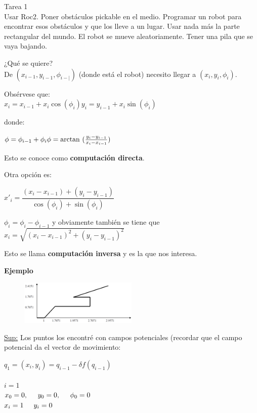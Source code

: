 \begin{scaja}
Tarea 1 \\
Usar Roc2. Poner obstáculos pickable en el medio. Programar un robot para encontrar esos obstáculos y que
los lleve a un lugar. Usar nada más la parte rectangular del mundo. El robot se mueve aleatoriamente. Tener
una pila que se vaya bajando.
\end{scaja}



¿Qué se quiere? \\
De $(x_{i-1},y_{i-1},\phi_{i-|})$ (donde está el robot) necesito llegar a $(x_i,y_i,\phi_i)$.

Obsérvese que: \\
 $x_i=x_{i-1}+x_i \cos(\phi_i)
 y_i=y_{i-1}+x_i \sin(\phi_i)
 $
 
donde:

$
\phi=\phi_{i-1}+\phi_i \\
\phi=\arctan\ (\frac{y_i -y_{i-1}}{x_i -x_{i-1}})
$


Esto se conoce como \textbf{computación directa}.

Otra opción es:

$
x'_i= \dfrac{(x_i - x_{i-1}) + (y_i - y_{i-1})}{\cos(\phi_i) + \sin(\phi_i)}
$

$
\phi_i = \phi_i - \phi_{i-1}
$
y obviamente también se tiene que $x_i = \sqrt{(x_i - x_{i-1})^2 + (y_i - y_{i-1})^2 }$



Esto se llama \textbf{computación inversa} y es la que nos interesa.



\textbf{Ejemplo}



\begin{figure}[h!]
	\centering
	\includegraphics[width=0.5\textwidth]{images/img63.png}
	\label{figura63}
\end{figure}


\underline{Sup:} Los puntos los encontré con campos potenciales (recordar que el campo potencial da el vector de
movimiento:

$q_1=(x_i,y_i) = q_{i-1} - \delta f (q_{i-1})$
\\ \\
$ i=1 $ \\
$ x_0 = 0, \hspace{0.5cm} y_0=0, \hspace{0.5cm} \phi_0=0 $ \\
$x_i =1 \hspace{0.5cm} y_i=0 $

